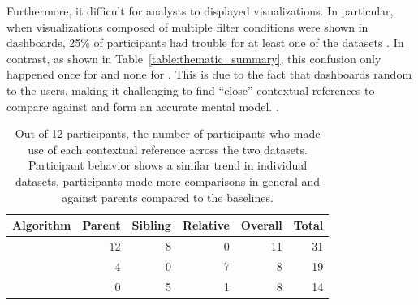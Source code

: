 \par Furthermore,  it difficult for analysts to  displayed visualizations. In particular, when visualizations composed of multiple filter conditions were shown in \cluster dashboards, 25\% of participants had trouble  for at least one of the datasets . In contrast, as shown in Table~\ref{table:thematic_summary}, this confusion only happened once for \BFS and none for \system. This is due to the fact that \cluster dashboards  random to the users, making it challenging to find ``close'' contextual references to compare against and form an accurate mental model. . %
\begin{table}[h!]
\hspace{-10pt}
\centering
	\begin{tabular}{|l|rrrr|r|}
	\hline
	 \small{Algorithm}   &    \small{Parent} &   \small{Sibling} &   \small{Relative} & \small{Overall} &   \small{Total} \\
	\hline
	 \small{\system}     &    \cellcolor{blue!25} 12 &       8 &     0 &  11 &      \cellcolor{blue!25} 31 \\
	 \small{\cluster}     &         4 &        0 &         7 &          8 &      19 \\
	 \small{\BFS}         &         0 &        5 &         1 &          8 &      14 \\
	\hline
	\end{tabular}
\caption{Out of 12 participants, the number of participants who made use of each contextual reference across the two datasets. Participant behavior shows a similar trend in individual datasets. \system participants made more comparisons in general and against parents compared to the baselines.}
\label{table:contextualReferenceCount}
\end{table}
